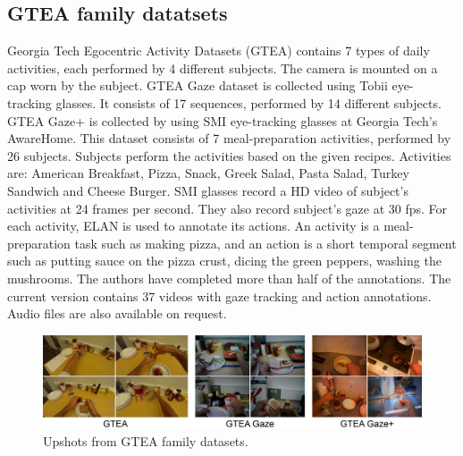 \subsection{GTEA family datatsets}
Georgia Tech Egocentric Activity Datasets (GTEA) \cite{5995444} contains 7 types of daily activities, each performed by 4 different subjects. The camera is mounted on a cap worn by the subject. 
GTEA Gaze \cite{fathigaze} dataset is collected using Tobii eye-tracking glasses. It consists of 17 sequences, performed by 14 different subjects. GTEA Gaze+ \cite{7298625} is collected by using SMI eye-tracking glasses at Georgia Tech's AwareHome. This dataset consists of 7 meal-preparation activities, performed by 26 subjects. Subjects perform the activities based on the given recipes. Activities are: American Breakfast, Pizza, Snack, Greek Salad, Pasta Salad, Turkey Sandwich and Cheese Burger. SMI glasses record a HD video of subject’s activities at 24 frames per second. They also record subject's gaze at 30 fps. For each activity, ELAN is used to annotate its actions. An activity is a meal-preparation task such as making pizza, and an action is a short temporal segment such as putting sauce on the pizza crust, dicing the green peppers, washing the mushrooms. The authors have completed more than half of the annotations. The current version contains 37 videos with gaze tracking and action annotations. Audio files are also available on request.
\begin{figure}[ht!]
	\centerline{\includegraphics[width=1\linewidth]{Figs/GTEA.jpg}}
	\caption{Upshots from GTEA family datasets.}
	\label{fig:gtea}
\end{figure}

